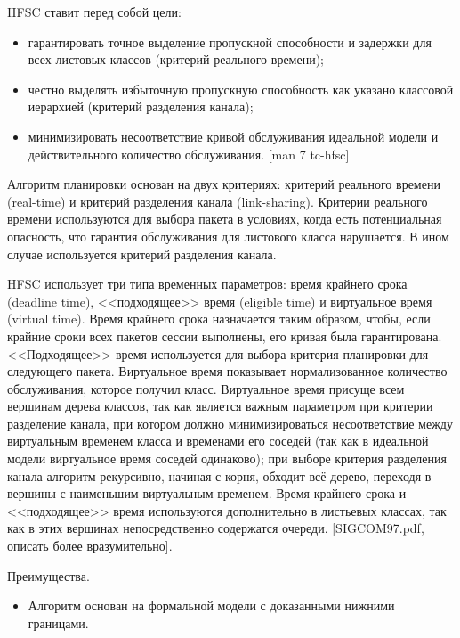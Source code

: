 	
        HFSC ставит перед собой цели:
		\begin{itemize}
            \item гарантировать точное выделение пропускной способности и задержки для всех листовых классов (критерий реального времени);
            \item честно выделять избыточную пропускную способность как указано классовой иерархией (критерий разделения канала);
            \item минимизировать несоответствие кривой обслуживания идеальной модели и действительного количество обслуживания. [man 7 tc-hfsc]
		\end{itemize}

        Алгоритм планировки основан на двух критериях: критерий реального времени
        (real-time) и критерий разделения канала (link-sharing). Критерии реального времени
        используются для выбора пакета в условиях, когда есть потенциальная опасность,
        что гарантия обслуживания для листового класса нарушается. В ином случае
        используется критерий разделения канала.

        HFSC использует три типа временных параметров: время крайнего срока (deadline
        time), <<подходящее>> время (eligible time) и виртуальное время (virtual time). Время крайнего
        срока назначается таким образом, чтобы, если крайние сроки всех пакетов сессии
        выполнены, его кривая была гарантирована. <<Подходящее>> время используется для
        выбора критерия планировки для следующего пакета. Виртуальное время показывает
        нормализованное количество обслуживания, которое получил класс. Виртуальное
        время присуще всем вершинам дерева классов, так как является важным параметром
        при критерии разделение канала, при котором должно минимизироваться
        несоответствие между виртуальным временем класса и временами его соседей
        (так как в идеальной модели виртуальное время соседей одинаково); при выборе
        критерия разделения канала алгоритм рекурсивно, начиная с корня, обходит всё
        дерево, переходя в вершины с наименьшим виртуальным временем. Время крайнего
        срока и <<подходящее>> время используются дополнительно в листьевых классах,
        так как в этих вершинах непосредственно содержатся очереди. [SIGCOM97.pdf, описать
        более вразумительно].

        Преимущества.
		\begin{itemize}
            \item Алгоритм основан на формальной модели с доказанными нижними границами.
		\end{itemize}


